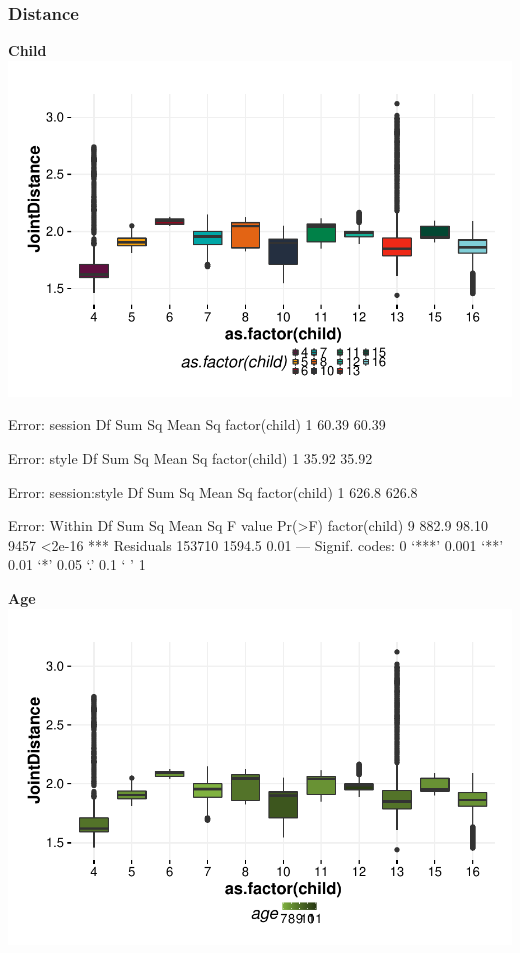 \documentclass{article}
\begin{document}
\subsubsection{Distance}
\textbf{Child}
\includegraphics{features-plot_distance_child_quiz}

\begin{Schunk}
\begin{Soutput}
Error: session
              Df Sum Sq Mean Sq
factor(child)  1  60.39   60.39

Error: style
              Df Sum Sq Mean Sq
factor(child)  1  35.92   35.92

Error: session:style
              Df Sum Sq Mean Sq
factor(child)  1  626.8   626.8

Error: Within
                  Df Sum Sq Mean Sq F value Pr(>F)    
factor(child)      9  882.9   98.10    9457 <2e-16 ***
Residuals     153710 1594.5    0.01                   
---
Signif. codes:  0 ‘***’ 0.001 ‘**’ 0.01 ‘*’ 0.05 ‘.’ 0.1 ‘ ’ 1
\end{Soutput}
\end{Schunk}

\textbf{Age}
\includegraphics{features-plot_distance_child_age_quiz}
\end{document}
